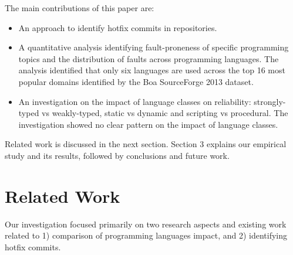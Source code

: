 \documentclass{sig-alternate}
\begin{document}
The main contributions of this paper are:
%
\begin{itemize}
  \item An  approach to identify hotfix commits in repositories.
  \item A quantitative analysis identifying fault-proneness of specific programming topics and the distribution of faults across programming languages. The analysis identified that only six languages are used across the top 16 most popular domains identified by the Boa SourceForge 2013 dataset.
  \item An investigation on the impact of language classes on reliability: strongly-typed vs weakly-typed, static vs dynamic and scripting vs procedural. The investigation showed no clear pattern on the impact of language classes.
\end{itemize}
%
Related work is discussed in the next section. Section 3 explains our empirical study and its results, followed by conclusions and future work.

\section{Related Work}

Our investigation focused primarily on two research aspects and existing work related to 1) comparison of programming languages impact, and 2) identifying hotfix commits.


\end{document}
